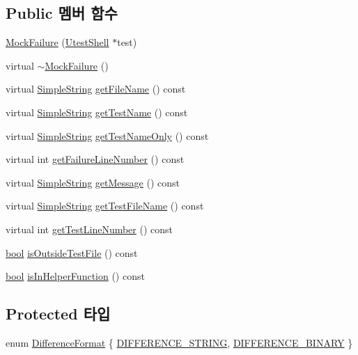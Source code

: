 \subsection*{Public 멤버 함수}
\begin{DoxyCompactItemize}
\item 
\hyperlink{class_mock_failure_aa65f1551bfe7e7b896e059a164d69c6b}{Mock\+Failure} (\hyperlink{class_utest_shell}{Utest\+Shell} $\ast$test)
\item 
virtual \hyperlink{class_mock_failure_aec0e468257ab449da077f16993d53eed}{$\sim$\+Mock\+Failure} ()
\item 
virtual \hyperlink{class_simple_string}{Simple\+String} \hyperlink{class_test_failure_ac74fa65c497d9a175304a14ffafcaa1a}{get\+File\+Name} () const 
\item 
virtual \hyperlink{class_simple_string}{Simple\+String} \hyperlink{class_test_failure_a02da3865d8c38e5fd122a08a5e23773e}{get\+Test\+Name} () const 
\item 
virtual \hyperlink{class_simple_string}{Simple\+String} \hyperlink{class_test_failure_ac5e7fcbcf3831504c42ee41691b0a7e7}{get\+Test\+Name\+Only} () const 
\item 
virtual int \hyperlink{class_test_failure_a9d41f8ad9667ed1f471676d49a655ec7}{get\+Failure\+Line\+Number} () const 
\item 
virtual \hyperlink{class_simple_string}{Simple\+String} \hyperlink{class_test_failure_a55ca73e984d01e477b9cc990acf7dffd}{get\+Message} () const 
\item 
virtual \hyperlink{class_simple_string}{Simple\+String} \hyperlink{class_test_failure_a2fb8d164bb0730492e0140ec8080f13f}{get\+Test\+File\+Name} () const 
\item 
virtual int \hyperlink{class_test_failure_a9fd9b831dfada83bbc2a1847918080a6}{get\+Test\+Line\+Number} () const 
\item 
\hyperlink{avb__gptp_8h_af6a258d8f3ee5206d682d799316314b1}{bool} \hyperlink{class_test_failure_a977b24b749f7dc0d279fed902991c7b4}{is\+Outside\+Test\+File} () const 
\item 
\hyperlink{avb__gptp_8h_af6a258d8f3ee5206d682d799316314b1}{bool} \hyperlink{class_test_failure_a8658daf09d68f724672ed9c7b1d94e95}{is\+In\+Helper\+Function} () const 
\end{DoxyCompactItemize}
\subsection*{Protected 타입}
\begin{DoxyCompactItemize}
\item 
enum \hyperlink{class_test_failure_aaadecd271c82449768993cbf919de0a2}{Difference\+Format} \{ \hyperlink{class_test_failure_aaadecd271c82449768993cbf919de0a2a1246a1a469970104212c9113e3f057c9}{D\+I\+F\+F\+E\+R\+E\+N\+C\+E\+\_\+\+S\+T\+R\+I\+NG}, 
\hyperlink{class_test_failure_aaadecd271c82449768993cbf919de0a2af76cc43dfdf0618b3cb16196894d5929}{D\+I\+F\+F\+E\+R\+E\+N\+C\+E\+\_\+\+B\+I\+N\+A\+RY}
 \}
\end{DoxyCompactItemize}
